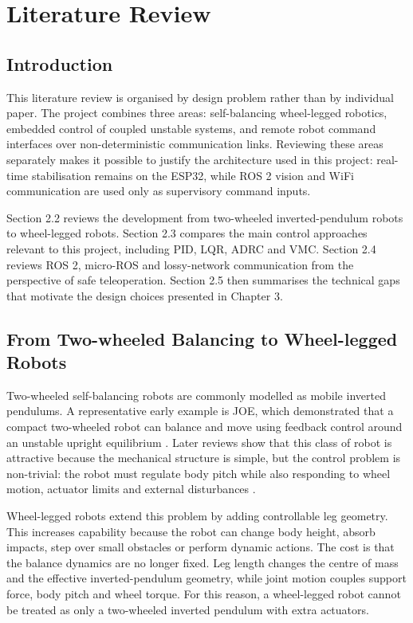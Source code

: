 \documentclass[12pt, a4paper]{article}
\begin{document}
\section{Literature Review}

\subsection{Introduction}

This literature review is organised by design problem rather than by individual paper. The project combines three areas: self-balancing wheel-legged robotics, embedded control of coupled unstable systems, and remote robot command interfaces over non-deterministic communication links. Reviewing these areas separately makes it possible to justify the architecture used in this project: real-time stabilisation remains on the ESP32, while ROS 2 vision and WiFi communication are used only as supervisory command inputs.

Section 2.2 reviews the development from two-wheeled inverted-pendulum robots to wheel-legged robots. Section 2.3 compares the main control approaches relevant to this project, including PID, LQR, ADRC and VMC. Section 2.4 reviews ROS 2, micro-ROS and lossy-network communication from the perspective of safe teleoperation. Section 2.5 then summarises the technical gaps that motivate the design choices presented in Chapter 3.

\subsection{From Two-wheeled Balancing to Wheel-legged Robots}

Two-wheeled self-balancing robots are commonly modelled as mobile inverted pendulums. A representative early example is JOE, which demonstrated that a compact two-wheeled robot can balance and move using feedback control around an unstable upright equilibrium \cite{grasser2002joe}. Later reviews show that this class of robot is attractive because the mechanical structure is simple, but the control problem is non-trivial: the robot must regulate body pitch while also responding to wheel motion, actuator limits and external disturbances \cite{chan2013review}.

Wheel-legged robots extend this problem by adding controllable leg geometry. This increases capability because the robot can change body height, absorb impacts, step over small obstacles or perform dynamic actions. The cost is that the balance dynamics are no longer fixed. Leg length changes the centre of mass and the effective inverted-pendulum geometry, while joint motion couples support force, body pitch and wheel torque. For this reason, a wheel-legged robot cannot be treated as only a two-wheeled inverted pendulum with extra actuators.
\end{document}
